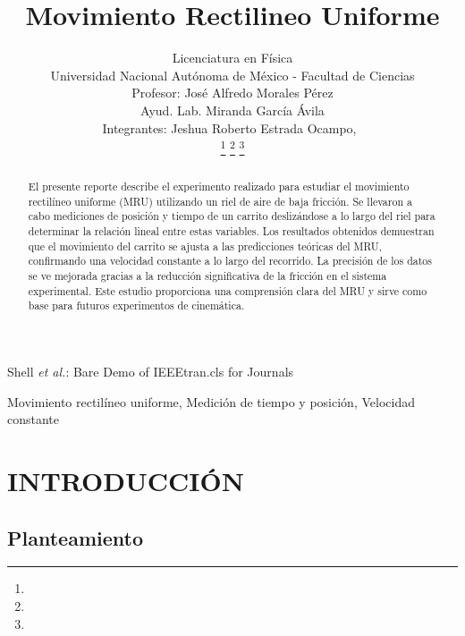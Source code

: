 \documentclass[journal]{IEEEtran}
\begin{document}
\title{Movimiento Rectilineo Uniforme }

\author{Licenciatura en Física	\\
Universidad Nacional Autónoma de México - Facultad de Ciencias\\
Profesor: José Alfredo Morales Pérez\\
Ayud. Lab.	Miranda García Ávila\\
Integrantes: Jeshua Roberto Estrada Ocampo,~\\
            
\thanks{}%
\thanks{}%
\thanks{}}

%
{Shell \MakeLowercase{\textit{et al.}}: Bare Demo of IEEEtran.cls for Journals}

\maketitle

\begin{abstract}
El presente reporte describe el experimento realizado para estudiar el movimiento rectilíneo uniforme (MRU) utilizando un riel de aire de baja fricción. Se llevaron a cabo mediciones de posición y tiempo de un carrito deslizándose a lo largo del riel para determinar la relación lineal entre estas variables. Los resultados obtenidos demuestran que el movimiento del carrito se ajusta a las predicciones teóricas del MRU, confirmando una velocidad constante a lo largo del recorrido. La precisión de los datos se ve mejorada gracias a la reducción significativa de la fricción en el sistema experimental. Este estudio proporciona una comprensión clara del MRU y sirve como base para futuros experimentos de cinemática.
\end{abstract}

\begin{IEEEkeywords}
Movimiento rectilíneo uniforme, Medición de tiempo y posición, Velocidad constante
\end{IEEEkeywords}

\IEEEpeerreviewmaketitle

\section{INTRODUCCIÓN}
\subsection{Planteamiento}
\end{document}
